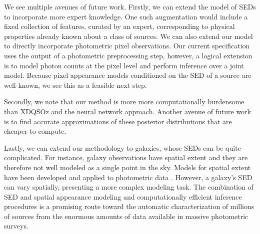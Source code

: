 \documentclass{article} %
\begin{document}
We see multiple avenues of future work.
Firstly, we can extend the model of SEDs to incorporate more expert knowledge.
One such augmentation would include a fixed collection of features, curated by an expert, corresponding to physical properties already known about a class of sources.  
We can also extend our model to directly incorporate photometric pixel observations.
Our current specification uses the output of a photometric preprocessing step, however, a logical extension is to model photon counts at the pixel level and perform inference over a joint model. 
Because pixel appearance models conditioned on the SED of a source are well-known, we see this as a feasible next step. 

Secondly, we note that our method is more more computationally burdensome than XDQSOz and the neural network approach.  Another avenue of future work is to find accurate approximations of these posterior distributions that are cheaper to compute. 

Lastly, we can extend our methodology to galaxies, whose SEDs can be quite complicated.
For instance, galaxy observations have spatial extent and they are therefore not well modeled as a single point in the sky.  
Models for spatial extent have been developed and applied to photometric data \cite{hogg2013replacing, regier2015}.  
However, a galaxy's SED can vary spatially, presenting a more complex modeling task.    
The combination of SED and spatial appearance modeling and computationally efficient inference procedures is a promising route toward the automatic characterization of millions of sources from the enormous amounts of data available in massive photometric surveys.  

\end{document}
